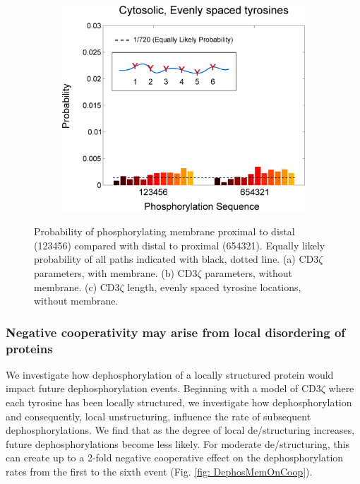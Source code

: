 \documentclass[../../AdvancementSummary.tex]{subfiles}
\begin{document}
\begin{figure}[H]
\begin{center}
\begin{subfigure}{0.3\linewidth}
			\caption{}
		\end{subfigure}
		\begin{subfigure}{0.3\linewidth}
			\includegraphics[width=\linewidth]{ResultsFigures/StiffeningSequentialBinding/EvenSites/ProbVSSequence.eps}
			\caption{}
		\end{subfigure}
	\end{center}
	\caption{Probability of phosphorylating membrane proximal to distal (123456) compared with distal to proximal (654321). Equally likely probability of all paths indicated with black, dotted line. (a) CD3$\zeta$ parameters, with membrane. (b) CD3$\zeta$ parameters, without membrane. (c) CD3$\zeta$ length, evenly spaced tyrosine locations, without membrane. \label{fig: StiffeningSeqBind}}
\end{figure}

\subsubsection{Negative cooperativity may arise from local disordering of proteins}

We investigate how dephosphorylation of a locally structured protein would impact future dephosphorylation events. Beginning with a model of CD3$\zeta$ where each tyrosine has been locally structured, we investigate how dephosphorylation and consequently, local unstructuring, influence the rate of subsequent dephosphorylations. We find that as the degree of local de/structuring increases, future dephosphorylations become less likely. For moderate de/structuring, this can create up to a 2-fold negative cooperative effect on the dephosphorylation rates from the first to the sixth event (Fig. \ref{fig: DephosMemOnCoop}).
\end{document}
